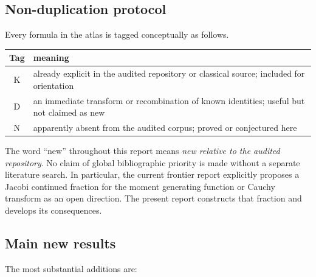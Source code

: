\documentclass[11pt]{article}
\theoremstyle{definition}
\theoremstyle{remark}
\newcommand{\statusknown}{\textsf{K}}
\newcommand{\statusderived}{\textsf{D}}
\newcommand{\statusnew}{\textsf{N}}
\begin{document}
\subsection{Non-duplication protocol}

Every formula in the atlas is tagged conceptually as follows.

\begin{center}
\begin{tabular}{@{}c p{}@{}}
\toprule
Tag & meaning \\
\midrule
\statusknown & already explicit in the audited repository or classical source; included for orientation \\
\statusderived & an immediate transform or recombination of known identities; useful but not claimed as new \\
\statusnew & apparently absent from the audited corpus; proved or conjectured here \\
\bottomrule
\end{tabular}
\end{center}

The word ``new'' throughout this report means \emph{new relative to the audited repository}.
No claim of global bibliographic priority is made without a separate literature search.
In particular, the current frontier report explicitly proposes a Jacobi continued fraction
for the moment generating function or Cauchy transform as an open direction.  The present
report constructs that fraction and develops its consequences.

\subsection{Main new results}

The most substantial additions are:
\end{document}
